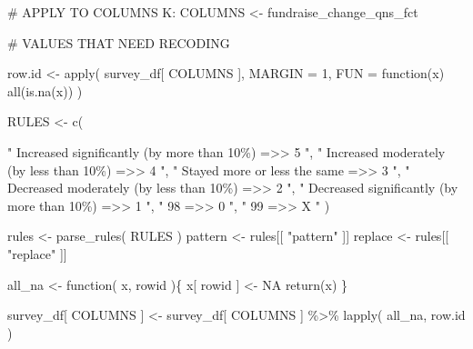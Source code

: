\documentclass[
  letterpaper,
]{scrbook}
\newenvironment{Shaded}{\begin{snugshade}}{\end{snugshade}}
\newcommand{\AttributeTok}[1]{\textcolor[rgb]{0.40,0.45,0.13}{#1}}
\newcommand{\CommentTok}[1]{\textcolor[rgb]{0.37,0.37,0.37}{#1}}
\newcommand{\ConstantTok}[1]{\textcolor[rgb]{0.56,0.35,0.01}{#1}}
\newcommand{\ControlFlowTok}[1]{\textcolor[rgb]{0.00,0.23,0.31}{#1}}
\newcommand{\DecValTok}[1]{\textcolor[rgb]{0.68,0.00,0.00}{#1}}
\newcommand{\FunctionTok}[1]{\textcolor[rgb]{0.28,0.35,0.67}{#1}}
\newcommand{\NormalTok}[1]{\textcolor[rgb]{0.00,0.23,0.31}{#1}}
\newcommand{\OtherTok}[1]{\textcolor[rgb]{0.00,0.23,0.31}{#1}}
\newcommand{\SpecialCharTok}[1]{\textcolor[rgb]{0.37,0.37,0.37}{#1}}
\newcommand{\StringTok}[1]{\textcolor[rgb]{0.13,0.47,0.30}{#1}}
\begin{document}
\begin{Shaded}
\begin{Highlighting}[]
\CommentTok{\# APPLY TO COLUMNS K:}
\NormalTok{COLUMNS }\OtherTok{\textless{}{-}}\NormalTok{  fundraise\_change\_qns\_fct}

\CommentTok{\# VALUES THAT NEED RECODING}

\NormalTok{row.id }\OtherTok{\textless{}{-}} \FunctionTok{apply}\NormalTok{( survey\_df[ COLUMNS ], }
                 \AttributeTok{MARGIN =} \DecValTok{1}\NormalTok{, }
                 \AttributeTok{FUN =} \ControlFlowTok{function}\NormalTok{(x) }\FunctionTok{all}\NormalTok{(}\FunctionTok{is.na}\NormalTok{(x)) )}

\NormalTok{RULES }\OtherTok{\textless{}{-}} \FunctionTok{c}\NormalTok{(    }
          
     \StringTok{"   Increased significantly (by more than 10\%)    =\textgreater{}\textgreater{}     5   "}\NormalTok{,}
     \StringTok{"      Increased moderately (by less than 10\%)    =\textgreater{}\textgreater{}     4   "}\NormalTok{,}
     \StringTok{"                 Stayed more or less the same    =\textgreater{}\textgreater{}     3   "}\NormalTok{,}
     \StringTok{"      Decreased moderately (by less than 10\%)    =\textgreater{}\textgreater{}     2   "}\NormalTok{,}
     \StringTok{"   Decreased significantly (by more than 10\%)    =\textgreater{}\textgreater{}     1   "}\NormalTok{,}
     \StringTok{"                                           98    =\textgreater{}\textgreater{}     0   "}\NormalTok{,}
     \StringTok{"                                           99    =\textgreater{}\textgreater{}     X   "}\NormalTok{  )}
 
\NormalTok{rules }\OtherTok{\textless{}{-}} \FunctionTok{parse\_rules}\NormalTok{( RULES )          }
\NormalTok{pattern }\OtherTok{\textless{}{-}}\NormalTok{ rules[[ }\StringTok{"pattern"}\NormalTok{ ]]}
\NormalTok{replace }\OtherTok{\textless{}{-}}\NormalTok{ rules[[ }\StringTok{"replace"}\NormalTok{ ]]}


\NormalTok{all\_na }\OtherTok{\textless{}{-}} \ControlFlowTok{function}\NormalTok{( x, rowid )\{}
\NormalTok{  x[ rowid ] }\OtherTok{\textless{}{-}} \ConstantTok{NA}
  \FunctionTok{return}\NormalTok{(x)}
\NormalTok{\}}

\NormalTok{survey\_df[ COLUMNS ] }\OtherTok{\textless{}{-}} 
\NormalTok{  survey\_df[ COLUMNS ] }\SpecialCharTok{\%\textgreater{}\%} 
  \FunctionTok{lapply}\NormalTok{( all\_na, row.id )}



\end{Highlighting}
\end{Shaded}
\end{document}
